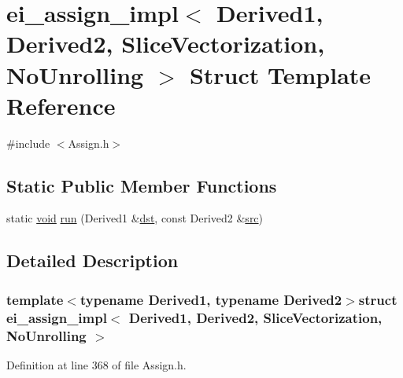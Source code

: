 \hypertarget{structei__assign__impl_3_01_derived1_00_01_derived2_00_01_slice_vectorization_00_01_no_unrolling_01_4}{\section{ei\-\_\-assign\-\_\-impl$<$ Derived1, Derived2, Slice\-Vectorization, No\-Unrolling $>$ Struct Template Reference}
\label{structei__assign__impl_3_01_derived1_00_01_derived2_00_01_slice_vectorization_00_01_no_unrolling_01_4}
}


{\ttfamily \#include $<$Assign.\-h$>$}

\subsection*{Static Public Member Functions}
\begin{DoxyCompactItemize}
\item 
static \hyperlink{group___u_a_v_objects_plugin_ga444cf2ff3f0ecbe028adce838d373f5c}{void} \hyperlink{structei__assign__impl_3_01_derived1_00_01_derived2_00_01_slice_vectorization_00_01_no_unrolling_01_4_acc27def2eb646cf38c219d29c730ad57}{run} (Derived1 \&\hyperlink{glext_8h_a92034251bfd455d524a9b5610cddba00}{dst}, const Derived2 \&\hyperlink{glext_8h_a72e0fdf0f845ded60b1fada9e9195cd7}{src})
\end{DoxyCompactItemize}


\subsection{Detailed Description}
\subsubsection*{template$<$typename Derived1, typename Derived2$>$struct ei\-\_\-assign\-\_\-impl$<$ Derived1, Derived2, Slice\-Vectorization, No\-Unrolling $>$}



Definition at line 368 of file Assign.\-h.



